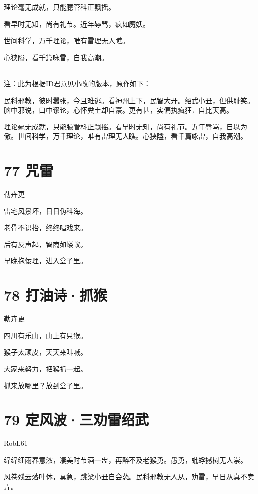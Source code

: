 \documentclass[UTF8,12pt,oneside]{ctexbook}
\def\pau#1{\begin{center} {#1} \end{center}} %
\def\poem#1#2{\section{#1}\pau{#2}} %
\def\lidend{\setlength\parindent{2em}}
\begin{document}
        理论毫无成就，只能臆管科正飘摇。
        
        看早时无知，尚有礼节。近年辱骂，疯如魔妖。
        
        世间科学，万千理论，唯有雷理无人瞧。
        
        心狭隘，看千篇咏雷，自我高潮。
        
        \lidend
        ~\\
        
        \noindent 注：此为根据ID君意见小改的版本，原作如下：

        \kaishu
        民科邪教，彼时嚣张，今且难逃。看神州上下，民智大开。绍武小丑，但供耻笑。脑中邪说，口中谬论，心怀粪土却自豪。更有甚，实偏执疯狂，自比天高。 
        
        理论毫无成就，只能臆管科正飘摇。看早时无知，尚有礼节。近年辱骂，自以为傲。世间科学，万千理论，唯有雷理无人瞧。心狭隘，看千篇咏雷，自我高潮。
        \songti
        
    \newpage %
        
    \poem{77 咒雷}{勒卉更} %
                       \begin{center}
                       雷宅风景坏，日日伪科海。

                       老骨不识抬，终终唱戏来。 

                       后有反声起，智商如蝼蚁。 

                       早晚抱佞理，进入盒子里。
                       \end{center}
        
        
    \poem{78 打油诗·抓猴}{勒卉更} %
        
        \begin{center} %
        四川有乐山，山上有只猴。

        猴子太顽皮，天天来叫喊。

        大家来努力，把猴抓一起。

        抓来放哪里？放到盒子里。

        \end{center}
    
    \poem{79 定风波·三劝雷绍武}{RobL61}

    绵绵细雨春意浓，凄美时节酒一盅，再醉不及老猴勇。愚勇，蚍蜉撼树无人崇。 

    风卷残云落叶休，莫急，跳梁小丑自会怂。民科邪教无人从，劝雷，早日从真不卖弄。 
    
\end{document}
